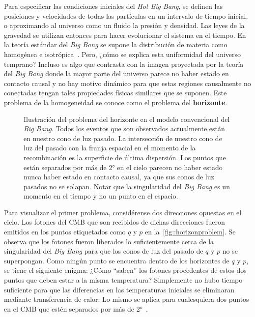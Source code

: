 Para especificar las condiciones iniciales del \textit{Hot Big Bang}, se definen las posiciones y velocidades de todas las partículas en un intervalo de tiempo inicial, o aproximando al universo como un fluido la presión y densidad. Las leyes de la gravedad se utilizan entonces para hacer evolucionar el sistema en el tiempo. En la teoría estándar del \textit{Big Bang} se supone la distribución de materia como homogénea e isotrópica~\cite{baumann2022cosmology}. Pero, ¿cómo se explica esta uniformidad del universo temprano? Incluso es algo que contrasta con la imagen proyectada por la teoría del \textit{Big Bang} donde la mayor parte del universo parece no haber estado en contacto causal y no hay motivo dinámico para que estas regiones causalmente no conectadas tengan tales propiedades físicas similares que se suponen. Este problema de la homogeneidad se conoce como el problema del \textbf{horizonte}.

\begin{figure}[t]
    \centering
    \def\svgwidth{0.75\textwidth}
    
    \caption[Ilustración del problema del horizonte]{Ilustración del problema del horizonte en el modelo convencional del \textit{Big Bang}. Todos los eventos que son observados actualmente están en nuestro cono de luz pasado. La intersección de nuestro cono de luz del pasado con la franja espacial en el momento de la recombinación es la superficie de última dispersión. Los puntos que están separados por más de 2° en el cielo parecen no haber estado nunca haber estado en contacto causal, ya que sus conos de luz pasados no se solapan. Notar que la singularidad del \textit{Big Bang} es un momento en el tiempo y no un punto en el espacio.}
    \label{fig::horizonproblem}
\end{figure}
Para visualizar el primer problema, considérense dos direcciones opuestas en el cielo. Los fotones del CMB que son recibidos de dichas direcciones fueron emitidos en los puntos etiquetados como \(q\) y \(p\) en la~\autoref{fig::horizonproblem}. Se observa que los fotones fueron liberados lo suficientemente cerca de la singularidad del \textit{Big Bang} para que los conos de luz del pasado de \(q\) y \(p\) no se superpongan. Como ningún punto se encuentra dentro de los horizontes de \(q\) y \(p\), se tiene el siguiente enigma: ¿Cómo ``saben'' los fotones procedentes de estos dos puntos que deben estar a la misma temperatura? Simplemente no hubo tiempo suficiente para que las diferencias en las temperaturas iniciales se eliminaran mediante transferencia de calor. Lo mismo se aplica para cualesquiera dos puntos en el CMB que estén separados por más de 2°~\cite{baumann2022cosmology}.


